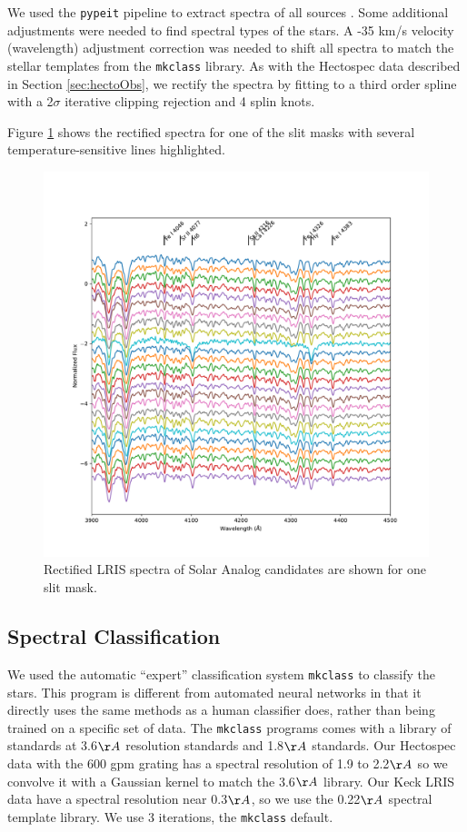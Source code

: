 \documentclass{aastex6}
\begin{document}
We used the \texttt{pypeit} pipeline to extract spectra of all sources \citep{prochaska2020pypeit}.
Some additional adjustments were needed to find spectral types of the stars.
A -35 km/s velocity (wavelength) adjustment correction was needed to shift all spectra to match the stellar templates from the \texttt{mkclass} \citep{gray2014classification} library.
As with the Hectospec data described in Section \ref{sec:hectoObs}, we rectify the spectra by fitting to a third order spline with a 2$\sigma$ iterative clipping rejection and 4 splin knots.

Figure \ref{fig:SpecRectLRIS} shows the rectified spectra for one of the slit masks with several temperature-sensitive lines highlighted.

\begin{figure}[!hbtp]
\centering
\includegraphics[width=.7\columnwidth]{all_spec_good_wavecal_2019-02-06-07_combined_spec_maskAnR1_rectified.pdf}
\caption{Rectified LRIS spectra of Solar Analog candidates are shown for one slit mask.}\label{fig:SpecRectLRIS}
\end{figure}

\clearpage
\subsection{Spectral Classification}

We used the automatic ``expert'' classification system \texttt{mkclass} \citep{gray2014classification} to classify the stars.
This program is different from automated neural networks in that it directly uses the same methods as a human classifier does, rather than being trained on a specific set of data.
The \texttt{mkclass} programs comes with a library of standards at 3.6$\AA$ resolution standards and 1.8$\AA$ standards.
Our Hectospec data with the 600 gpm grating has a spectral resolution of 1.9 to 2.2$\AA$ so we convolve it with a Gaussian kernel to match the 3.6$\AA$ library.
Our Keck LRIS data have a spectral resolution near 0.3$\AA$, so we use the 0.22$\AA$ spectral template library.
We use 3 iterations, the \texttt{mkclass} default.
\end{document}
